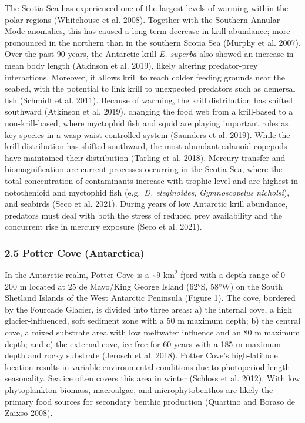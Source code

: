 \documentclass[
]{article}
\begin{document}
The Scotia Sea has experienced one of the largest levels of warming
within the polar regions (Whitehouse et al. 2008). Together with the
Southern Annular Mode anomalies, this has caused a long-term decrease in
krill abundance; more pronounced in the northern than in the southern
Scotia Sea (Murphy et al. 2007). Over the past 90 years, the Antarctic
krill \emph{E. superba} also showed an increase in mean body length
(Atkinson et al. 2019), likely altering predator-prey interactions.
Moreover, it allows krill to reach colder feeding grounds near the
seabed, with the potential to link krill to unexpected predators such as
demersal fish (Schmidt et al. 2011). Because of warming, the krill
distribution has shifted southward (Atkinson et al. 2019), changing the
food web from a krill-based to a non-krill-based, where myctophid fish
and squid are playing important roles as key species in a wasp-waist
controlled system (Saunders et al. 2019). While the krill distribution
has shifted southward, the most abundant calanoid copepods have
maintained their distribution (Tarling et al. 2018). Mercury transfer
and biomagnification are current processes occurring in the Scotia Sea,
where the total concentration of contaminants increase with trophic
level and are highest in notothenioid and myctophid fish (e.g.~\emph{D.
eleginoides}, \emph{Gymnoscopelus nicholsi}), and seabirds (Seco et al.
2021). During years of low Antarctic krill abundance, predators must
deal with both the stress of reduced prey availability and the
concurrent rise in mercury exposure (Seco et al. 2021).

\subsubsection{2.5 Potter Cove
(Antarctica)}\label{potter-cove-antarctica}

In the Antarctic realm, Potter Cove is a \textasciitilde9
\(\text{km}^2\) fjord with a depth range of 0 - 200 m located at 25 de
Mayo/King George Island (62°S, 58°W) on the South Shetland Islands of
the West Antarctic Peninsula (Figure 1). The cove, bordered by the
Fourcade Glacier, is divided into three areas: a) the internal cove, a
high glacier-influenced, soft sediment zone with a 50 m maximum depth;
b) the central cove, a mixed substrate area with low meltwater influence
and an 80 m maximum depth; and c) the external cove, ice-free for 60
years with a 185 m maximum depth and rocky substrate (Jerosch et al.
2018). Potter Cove's high-latitude location results in variable
environmental conditions due to photoperiod length seasonality. Sea ice
often covers this area in winter (Schloss et al. 2012). With low
phytoplankton biomass, macroalgae, and microphytobenthos are likely the
primary food sources for secondary benthic production (Quartino and
Boraso de Zaixso 2008).
\end{document}

